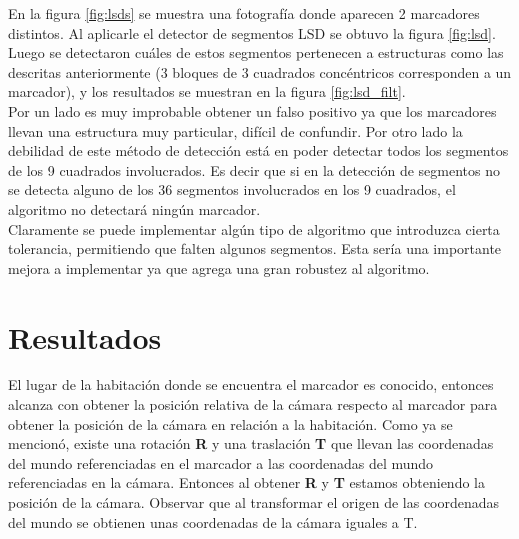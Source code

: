 \documentclass[main]{subfiles}
\begin{document}
En la figura \ref{fig:lsds} se muestra una fotografía donde aparecen 2 marcadores distintos. Al aplicarle el detector de segmentos LSD se obtuvo la figura \ref{fig:lsd}. Luego se detectaron cuáles de estos segmentos pertenecen a estructuras como las descritas anteriormente (3 bloques de 3 cuadrados concéntricos corresponden a un marcador), y los resultados se muestran en la figura \ref{fig:lsd_filt}.\\

Por un lado es muy improbable obtener un falso positivo ya que los marcadores llevan una estructura muy particular, difícil de confundir. Por otro lado la debilidad de este método de detección está en poder detectar todos los segmentos de los 9 cuadrados involucrados. Es decir que si en la detección de segmentos no se detecta alguno de los 36 segmentos involucrados en los 9 cuadrados, el algoritmo no detectará ningún marcador.\\

Claramente se puede implementar algún tipo de algoritmo que introduzca cierta tolerancia, permitiendo que falten algunos segmentos. Esta sería una importante mejora a implementar ya que agrega una gran robustez al algoritmo.

\section{Resultados}

El lugar de la habitación donde se encuentra el marcador es conocido, entonces alcanza con obtener la posición relativa de la cámara respecto al marcador para obtener la posición de la cámara en relación a la habitación. Como ya se mencionó, existe una rotación \textbf{R} y una traslación \textbf{T} que llevan las coordenadas del mundo referenciadas en el marcador a las coordenadas del mundo referenciadas en la cámara. Entonces al obtener \textbf{R} y \textbf{T} estamos obteniendo la posición de la cámara. Observar que al transformar el origen de las coordenadas del mundo se obtienen unas coordenadas de la cámara iguales a T.\\
\end{document}
